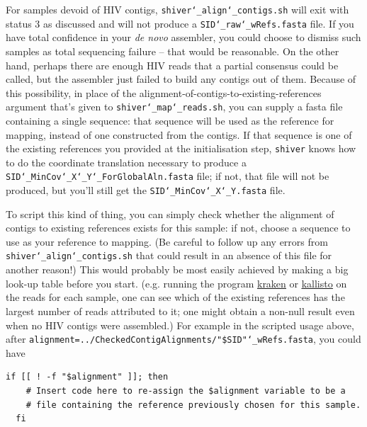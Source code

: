\documentclass{article}
\newcommand{\shiv}{\c{shiver}\xspace}
\newcommand{\sac}{\c{shiver\char`_align\char`_contigs.sh}\xspace}
\newcommand{\smr}{\c{shiver\char`_map\char`_reads.sh}\xspace}
\let\c\texttt
\newcommand{\www}{\color{blue} \underline}
\begin{document}
For samples devoid of HIV contigs, \sac will exit with status 3 as discussed and will not produce a \c{SID\char`_raw\char`_wRefs.fasta} file.
If you have total confidence in your {\it de novo} assembler, you could choose to dismiss such samples as total sequencing failure -- that would be reasonable.
On the other hand, perhaps there are enough HIV reads that a partial consensus could be called, but the assembler just failed to build any contigs out of them.
Because of this possibility, in place of the alignment-of-contigs-to-existing-references argument that's given to \smr, you can supply a fasta file containing a single sequence: that sequence will be used as the reference for mapping, instead of one constructed from the contigs.
If that sequence is one of the existing references you provided at the initialisation step, \shiv knows how to do the coordinate translation necessary to produce a \c{SID\char`_MinCov\char`_X\char`_Y\char`_ForGlobalAln.fasta} file; if not, that file will not be produced, but you'll still get the \c{SID\char`_MinCov\char`_X\char`_Y.fasta} file.

To script this kind of thing, you can simply check whether the alignment of contigs to existing references exists for this sample: if not, choose a sequence to use as your reference to mapping.
(Be careful to follow up any errors from \sac that could result in an absence of this file for another reason!)
This would probably be most easily achieved by making a big look-up table before you start.
(e.g. running the program \href{https://ccb.jhu.edu/software/kraken/}{\www{kraken}} or \href{https://pachterlab.github.io/kallisto/}{\www{kallisto}} on the reads for each sample, one can see which of the existing references has the largest number of reads attributed to it; one might obtain a non-null result even when no HIV contigs were assembled.)
For example in the scripted usage above, after \c{alignment=../CheckedContigAlignments/"\$SID"\char`_wRefs.fasta}, you could have
\begin{Verbatim}[samepage=true]
  if [[ ! -f "$alignment" ]]; then
    # Insert code here to re-assign the $alignment variable to be a
    # file containing the reference previously chosen for this sample.
  fi
\end{Verbatim}
\end{document}

